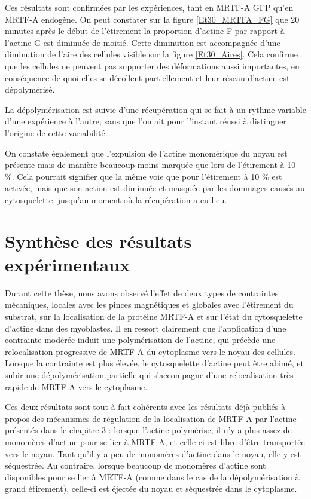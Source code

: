 Ces résultats sont confirmées par les expériences, tant en MRTF-A GFP qu'en MRTF-A endogène. On peut constater sur la figure \ref{Et30_MRTFA_FG} que 20 minutes après le début de l'étirement la proportion d'actine F par rapport à l'actine G est diminuée de moitié. Cette diminution est accompagnée d'une diminution de l'aire des cellules visible sur la figure \ref{Et30_Aires}. Cela confirme que les cellules ne peuvent pas supporter des déformations aussi importantes, en conséquence de quoi elles se décollent partiellement et leur réseau d'actine est dépolymérisé. 

La dépolymérisation est suivie d'une récupération qui se fait à un rythme variable d'une expérience à l'autre, sans que l'on ait pour l'instant réussi à distinguer l'origine de cette variabilité. 

On constate également que l'expulsion de l'actine monomérique du noyau est présente mais de manière beaucoup moins marquée que lors de l'étirement à 10 \%. Cela pourrait signifier que la même voie que pour l'étirement à 10 \% est activée, mais que son action est diminuée et masquée par les dommages causés au cytosquelette, jusqu'au moment où la récupération a eu lieu. 


\section{Synthèse des résultats expérimentaux}

Durant cette thèse, nous avons observé l'effet de deux types de contraintes mécaniques, locales avec les pinces magnétiques et globales avec l'étirement du substrat, sur la localisation de la protéine MRTF-A et sur l'état du cytosquelette d'actine dans des myoblastes. 
Il en ressort clairement que l'application d'une contrainte modérée induit une polymérisation de l'actine, qui précède une relocalisation progressive de MRTF-A du cytoplasme vers le noyau des cellules. Lorsque la contrainte est plus élevée, le cytosquelette d'actine peut être abimé, et subir une dépolymérisation partielle qui s'accompagne d'une relocalisation très rapide de MRTF-A vers le cytoplasme. 

Ces deux résultats sont tout à fait cohérents avec les résultats déjà publiés à propos des mécanismes de régulation de la localisation de MRTF-A par l'actine présentés dans le chapitre 3 : lorsque l'actine polymérise, il n'y a plus assez de monomères d'actine pour se lier à MRTF-A, et celle-ci est libre d'être transportée vers le noyau. Tant qu'il y a peu de monomères d'actine dans le noyau, elle y est séquestrée. Au contraire, lorsque beaucoup de monomères d'actine sont disponibles pour se lier à MRTF-A (comme dans le cas de la dépolymérisation à grand étirement), celle-ci est éjectée du noyau et séquestrée dans le cytoplasme. 

